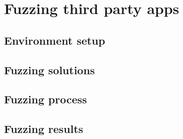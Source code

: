 \section{Fuzzing third party apps}
\subsection{Environment setup}
\subsection{Fuzzing solutions}
\subsection{Fuzzing process}
\subsection{Fuzzing results}